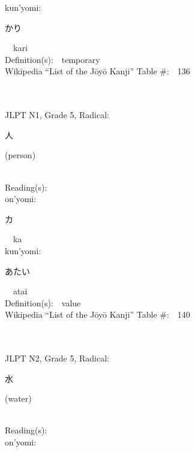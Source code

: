 \begin{multicols}{2}
{\hspace*{1em}}kun'yomi:\ \ \\
{\hspace*{2em}}{\begin{CJK}{UTF8}{min} かり \end{CJK}}\ \ kari\ \ \\
Definition(s):\ \ temporary \\
Wikipedia ``List of the J\=oy\=o Kanji'' Table \#:\ \ 136 \\
\ \ \\
{\fontsize{34pt}{40pt}  }\ \ \\  %
{JLPT N1, Grade 5, Radical:\ \ {\begin{CJK}{UTF8}{min} 人 \end{CJK}} (person) } \\
Reading(s):\ \ \\
{\hspace*{1em}}on'yomi:\ \ \\
{\hspace*{2em}}{\begin{CJK}{UTF8}{min} カ \end{CJK}}\ \ ka\ \ \\
{\hspace*{1em}}kun'yomi:\ \ \\
{\hspace*{2em}}{\begin{CJK}{UTF8}{min} あたい \end{CJK}}\ \ atai\ \ \\
Definition(s):\ \ value \\
Wikipedia ``List of the J\=oy\=o Kanji'' Table \#:\ \ 140 \\
\ \ \\
{\fontsize{34pt}{40pt}  }\ \ \\  %
{JLPT N2, Grade 5, Radical:\ \ {\begin{CJK}{UTF8}{min} 水 \end{CJK}} (water) } \\
Reading(s):\ \ \\
{\hspace*{1em}}on'yomi:\ \ \\

\end{multicols}
